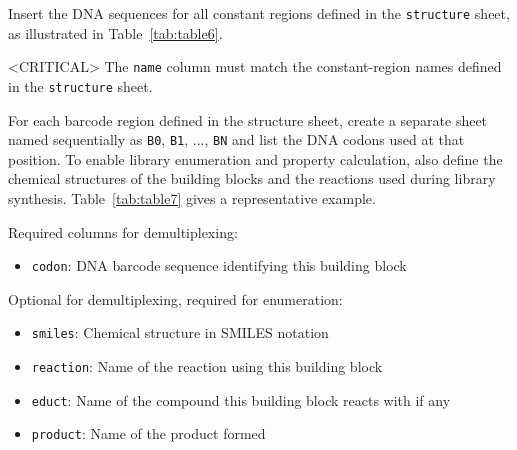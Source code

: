 
Insert the DNA sequences for all constant regions defined in the \texttt{structure} sheet, as illustrated in Table~\ref{tab:table6}.



<CRITICAL> The \texttt{name} column must match the constant-region names defined in the \texttt{structure} sheet.


For each barcode region defined in the structure sheet, create a separate sheet named sequentially as \texttt{B0}, \texttt{B1}, ..., \texttt{BN} and list the DNA codons used at that position. To enable library enumeration and property calculation, also define the chemical structures of the building blocks and the reactions used during library synthesis. Table~\ref{tab:table7} gives a representative example.

Required columns for demultiplexing:

\begin{itemize}
  \item \texttt{codon}: DNA barcode sequence identifying this building block
\end{itemize}
Optional for demultiplexing, required for enumeration:

\begin{itemize}
  \item \texttt{smiles}: Chemical structure in SMILES notation
  \item \texttt{reaction}: Name of the reaction using this building block
  \item \texttt{educt}: Name of the compound this building block reacts with if any
  \item \texttt{product}: Name of the product formed
\end{itemize}




